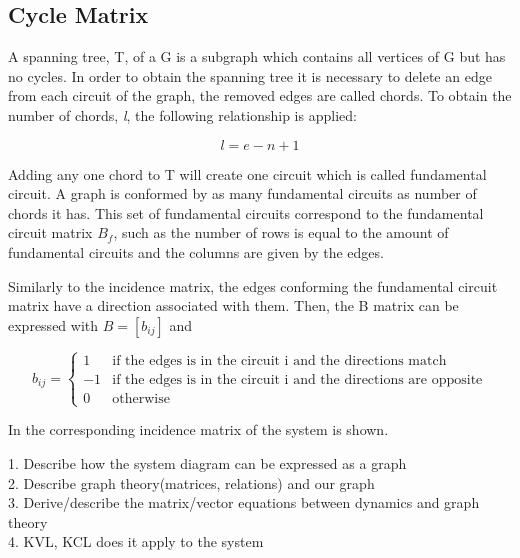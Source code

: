 
\subsection{Cycle Matrix}
\label{CycleSection}
A spanning tree, T, of a G is a subgraph which contains all vertices of G but has no cycles. 
In order to obtain the spanning tree it is necessary to delete an edge from each 
circuit of the graph, the removed edges are called chords. To obtain the number 
of chords, \textit{l}, the following relationship is applied:

\begin{equation}
  \label{Numberofchords}
  l = e - n +1
\end{equation}

Adding any one chord to T will create one circuit which is called fundamental 
circuit. A graph is conformed by as many fundamental circuits as number of chords it has.  
This set of fundamental circuits correspond to the fundamental circuit matrix 
$B_f$, such as the number of rows is equal to the amount of fundamental circuits and the columns are  
given by the edges. 

Similarly to the incidence matrix, the edges conforming the fundamental circuit 
matrix have a direction associated with them. Then, the B matrix can be 
expressed with $B = [b_{ij}]$ and

\begin{equation}
\label{DiGraphCycle}
 b_{ij} =
		\left\{
		\begin{array}{ll}
		
		1 			&      \text{if the edges is in the circuit i and the directions match}	
\\
		-1                       &     \text{if the edges is in the circuit i and the directions are opposite}
\\

                0                       &      \text{otherwise}

		\end{array}
		\right.
\end{equation}	

In  the corresponding incidence matrix of the system is 
shown.


1. Describe how the system diagram can be expressed as a graph \\
2. Describe graph theory(matrices, relations) and our graph\\
3. Derive/describe the matrix/vector equations between dynamics and graph theory\\
4. KVL, KCL does it apply to the system 
